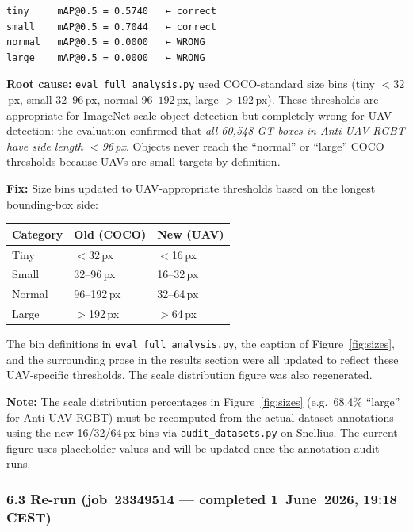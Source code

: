 \begin{verbatim}
tiny     mAP@0.5 = 0.5740   ← correct
small    mAP@0.5 = 0.7044   ← correct
normal   mAP@0.5 = 0.0000   ← WRONG
large    mAP@0.5 = 0.0000   ← WRONG
\end{verbatim}

\noindent \textbf{Root cause:} \texttt{eval\_full\_analysis.py} used
COCO-standard size bins (tiny $<32$\,px, small $32$--$96$\,px,
normal $96$--$192$\,px, large $>192$\,px). These thresholds are
appropriate for ImageNet-scale object detection but completely
wrong for UAV detection: the evaluation confirmed that
\emph{all 60,548 GT boxes in Anti-UAV-RGBT have side length $<$96\,px}.
Objects never reach the ``normal'' or ``large'' COCO thresholds
because UAVs are small targets by definition.

\noindent \textbf{Fix:} Size bins updated to UAV-appropriate thresholds
based on the longest bounding-box side:

\begin{center}\small
\begin{tabular}{lll}
\hline
\textbf{Category} & \textbf{Old (COCO)} & \textbf{New (UAV)} \\
\hline
Tiny   & $<$32\,px   & $<$16\,px \\
Small  & 32--96\,px  & 16--32\,px \\
Normal & 96--192\,px & 32--64\,px \\
Large  & $>$192\,px  & $>$64\,px \\
\hline
\end{tabular}
\end{center}

\noindent The bin definitions in \texttt{eval\_full\_analysis.py},
the caption of Figure~\ref{fig:sizes}, and the surrounding prose in
the results section were all updated to reflect these UAV-specific
thresholds. The scale distribution figure was also regenerated.

\noindent \textbf{Note:} The scale distribution percentages in
Figure~\ref{fig:sizes} (e.g.\ 68.4\% ``large'' for Anti-UAV-RGBT)
must be recomputed from the actual dataset annotations using the
new 16/32/64\,px bins via \texttt{audit\_datasets.py} on Snellius.
The current figure uses placeholder values and will be updated
once the annotation audit runs.

\subsubsection*{6.3 Re-run (job~23349514 — completed 1~June~2026, 19:18 CEST)}

